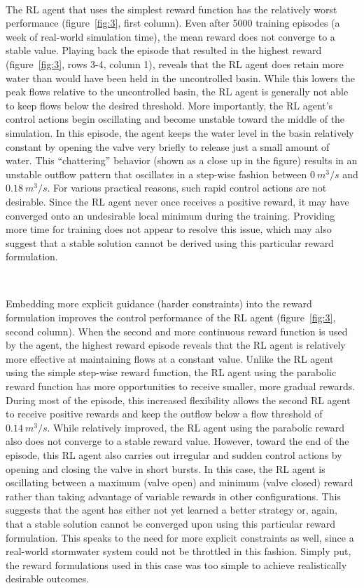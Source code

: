 \

The RL agent that uses the simplest reward function has the relatively worst performance (figure~\ref{fig:3}, first column).
Even after 5000 training episodes (a week of real-world simulation time), the mean reward does not converge to a stable value.
Playing back the episode that resulted in the highest reward (figure~\ref{fig:3}, rows 3-4, column 1), reveals that the RL agent does retain more water than would have been held in the uncontrolled basin.
While this lowers the peak flows relative to the uncontrolled basin, the RL agent is generally not able to keep flows below the desired threshold.
More importantly, the RL agent's control actions begin oscillating and become unstable toward the middle of the simulation.
In this episode, the agent keeps the water level in the basin relatively constant by opening the valve very briefly to release just a small amount of water.
This “chattering” behavior (shown as a close up in the figure) results in an unstable outflow pattern that oscillates in a step-wise fashion between $0\ m^3/s$ and $0.18\ m^3/s$.
For various practical reasons, such rapid control actions are not desirable.
Since the RL agent never once receives a positive reward, it may have converged onto an undesirable local minimum during the training.
Providing more time for training does not appear to resolve this issue, which may also suggest that a stable solution cannot be derived using this particular reward formulation.

\

Embedding more explicit guidance (harder constraints) into the reward formulation improves the control performance of the RL agent (figure~\ref{fig:3}, second column).
When the second and more continuous reward function is used by the agent, the highest reward episode reveals that the RL agent is relatively more effective at maintaining flows at a constant value.
Unlike the RL agent using the simple step-wise reward function, the RL agent using the parabolic reward function has more opportunities to receive smaller, more gradual rewards.
During most of the episode, this increased flexibility allows the second RL agent to receive positive rewards and keep the outflow below a flow threshold of $0.14\ m^3/s$.
While relatively improved, the RL agent using the parabolic reward also does not converge to a stable reward value.
However, toward the end of the episode, this RL agent also carries out irregular and sudden control actions by opening and closing the valve in short bursts.
In this case, the RL agent is oscillating between a maximum (valve open) and minimum (valve closed) reward rather than taking advantage of variable rewards in other configurations.
This suggests that the agent has either not yet learned a better strategy or, again, that a stable solution cannot be converged upon using this particular reward formulation.
This speaks to the need for more explicit constraints as well, since a real-world stormwater system could not be throttled in this fashion. Simply put, the reward formulations used in this case was too simple to achieve realistically desirable outcomes.


